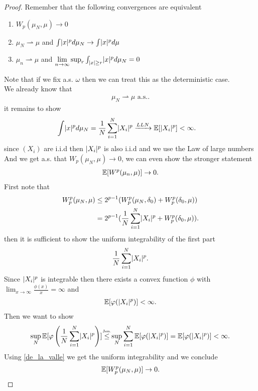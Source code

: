 \begin{proof}
 Remember that the following convergences are equivalent 
 \begin{enumerate}
   \item $W_p(\mu_N,\mu ) \to 0$
   \item $\mu_N \rightharpoonup \mu $ and $\int \lvert x\rvert^{p} d\mu_N \to \int \lvert x\rvert^{p} d\mu   $
   \item $\mu_n \rightharpoonup \mu $ and $\lim_{n\to \infty} \sup_r \int_{\abs{x} \ge r} \abs{x}^p d\mu_N = 0$
 \end{enumerate}
 Note that if we fix a.s. $\omega $ then we can treat this as the deterministic case. \\[1ex]
 We already know that 
 \begin{align*}
  \mu_N \rightharpoonup \mu \text{ a.s.}
 .\end{align*}
 it remains to show 
 \begin{align*}
   \int \lvert x\rvert^{p} d\mu_N   &= \frac{1}{N}\sum_{i=1}^{N} \lvert X_i\rvert^{p}  \xrightarrow{LLN} \mathbb{E}[\lvert X_i\rvert^{p} ] < \infty
 .\end{align*}
 since $(X_i)$ are i.i.d then $\lvert X_i\rvert^{p} $ is also i.i.d  and we use the Law of large numbers\\
 And we get a.s. that $W_p(\mu_N,\mu ) \to  0$, we can even show the stronger statement 
 \begin{align*}
   \mathbb{E}[W^{p}(\mu_n,\mu ) ] \to  0
 .\end{align*}
First note that  
 \begin{align*}
   W_p^{p}(\mu_N,\mu )  &\le  2^{p-1} (W^{p}_p(\mu_N,\delta_0)  + W_p^{p}(\delta_0,\mu )) \\
                        &= 2^{p-1} (\frac{1}{N} \sum_{i=1}^{N}   \lvert X_i\rvert^{p}  + W_p^{p}(\delta_0,\mu ))
 .\end{align*}
 then it is sufficient to show the uniform integrability of the first part 
 \begin{align*}
  \frac{1}{N}\sum_{i=1}^{N} \lvert X_i\rvert^{p}  
 .\end{align*}
 Since $\lvert X_i\rvert^{p} $ is integrable then there exists a convex function  $\phi $ with $\lim_{x \to \infty} \frac{\phi(x)}{x} = \infty$ and 
 \begin{align*}
   \mathbb{E}[\varphi(\lvert X_i\rvert^{p} )] < \infty
 .\end{align*}
 Then we want to show  
 \begin{align*}
   \sup_N \E[\phi \left(\frac{1}{N}\sum_{i=1}^{N} \abs{X_i}^{p}\right)  ]  \myS{Jen.}{\le } \sup_N \sum_{i=1}^{N}\E[\phi (\abs{X_i}^{p} )] =  \E[\phi(\abs{X_i}^{p} )] < \infty
 .\end{align*}
 Using \autoref{de_la_valle} we get the uniform integrability and we conclude 
 \begin{align*}
   \mathbb{E}[W_p^{p}(\mu_N,\mu ) ]\to 0
 .\end{align*}
\end{proof}
